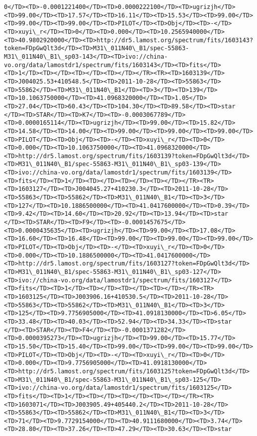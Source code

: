 \documentclass[11pt]{article}
\begin{document}
\begin{Verbatim}[commandchars=\\\{\}]
0</TD><TD>-0.0001221400</TD><TD>0.0000222100</TD><TD>ugrizjh</TD><TD>99.00</TD><TD>17.57</TD><TD>16.11</TD><TD>15.53</TD><TD>99.00</TD><TD>99.00</TD><TD>99.00</TD><TD>PILOT</TD><TD>Obj</TD><TD>-</TD><TD>xuyi\_r</TD><TD>0</TD><TD>0.000</TD><TD>10.2565940000</TD><TD>40.9802920000</TD><TD>http://dr5.lamost.org/spectrum/fits/1603143?token=FDpGwQlt3d</TD><TD>M31\_011N40\_B1/spec-55863-M31\_011N40\_B1\_sp03-143</TD><TD>ivo://china-vo.org/data/lamostdr1/spectrum/fits/1603143</TD><TD>fits</TD><TD>1</TD><TD></TD><TD></TD><TD></TD></TR><TR><TD>1603139</TD><TD>J004025.53+410548.5</TD><TD>2011-10-28</TD><TD>55863</TD><TD>55862</TD><TD>M31\_011N40\_B1</TD><TD>3</TD><TD>139</TD><TD>10.1063750000</TD><TD>41.0968320000</TD><TD>1.05</TD><TD>27.04</TD><TD>60.43</TD><TD>104.30</TD><TD>89.58</TD><TD>star     </TD><TD>STAR</TD><TD>K7</TD><TD>-0.0003067789</TD><TD>0.0000165114</TD><TD>ugrizjh</TD><TD>99.00</TD><TD>15.82</TD><TD>14.58</TD><TD>14.00</TD><TD>99.00</TD><TD>99.00</TD><TD>99.00</TD><TD>PILOT</TD><TD>Obj</TD><TD>-</TD><TD>xuyi\_r</TD><TD>0</TD><TD>0.000</TD><TD>10.1063750000</TD><TD>41.0968320000</TD><TD>http://dr5.lamost.org/spectrum/fits/1603139?token=FDpGwQlt3d</TD><TD>M31\_011N40\_B1/spec-55863-M31\_011N40\_B1\_sp03-139</TD><TD>ivo://china-vo.org/data/lamostdr1/spectrum/fits/1603139</TD><TD>fits</TD><TD>1</TD><TD></TD><TD></TD><TD></TD></TR><TR><TD>1603127</TD><TD>J004045.27+410230.3</TD><TD>2011-10-28</TD><TD>55863</TD><TD>55862</TD><TD>M31\_011N40\_B1</TD><TD>3</TD><TD>127</TD><TD>10.1886500000</TD><TD>41.0417600000</TD><TD>0.39</TD><TD>9.42</TD><TD>14.60</TD><TD>20.92</TD><TD>13.94</TD><TD>star     </TD><TD>STAR</TD><TD>F9</TD><TD>-0.0001457675</TD><TD>0.0000435635</TD><TD>ugrizjh</TD><TD>99.00</TD><TD>17.08</TD><TD>16.60</TD><TD>16.48</TD><TD>99.00</TD><TD>99.00</TD><TD>99.00</TD><TD>PILOT</TD><TD>Obj</TD><TD>-</TD><TD>xuyi\_r</TD><TD>0</TD><TD>0.000</TD><TD>10.1886500000</TD><TD>41.0417600000</TD><TD>http://dr5.lamost.org/spectrum/fits/1603127?token=FDpGwQlt3d</TD><TD>M31\_011N40\_B1/spec-55863-M31\_011N40\_B1\_sp03-127</TD><TD>ivo://china-vo.org/data/lamostdr1/spectrum/fits/1603127</TD><TD>fits</TD><TD>1</TD><TD></TD><TD></TD><TD></TD></TR><TR><TD>1603125</TD><TD>J003906.16+410530.5</TD><TD>2011-10-28</TD><TD>55863</TD><TD>55862</TD><TD>M31\_011N40\_B1</TD><TD>3</TD><TD>125</TD><TD>9.7756905000</TD><TD>41.0918130000</TD><TD>6.05</TD><TD>33.48</TD><TD>40.03</TD><TD>52.94</TD><TD>34.33</TD><TD>star     </TD><TD>STAR</TD><TD>F4</TD><TD>-0.0001371282</TD><TD>0.0000395273</TD><TD>ugrizjh</TD><TD>99.00</TD><TD>15.77</TD><TD>15.50</TD><TD>15.40</TD><TD>99.00</TD><TD>99.00</TD><TD>99.00</TD><TD>PILOT</TD><TD>Obj</TD><TD>-</TD><TD>xuyi\_r</TD><TD>0</TD><TD>0.000</TD><TD>9.7756905000</TD><TD>41.0918130000</TD><TD>http://dr5.lamost.org/spectrum/fits/1603125?token=FDpGwQlt3d</TD><TD>M31\_011N40\_B1/spec-55863-M31\_011N40\_B1\_sp03-125</TD><TD>ivo://china-vo.org/data/lamostdr1/spectrum/fits/1603125</TD><TD>fits</TD><TD>1</TD><TD></TD><TD></TD><TD></TD></TR><TR><TD>1603071</TD><TD>J003905.49+405440.2</TD><TD>2011-10-28</TD><TD>55863</TD><TD>55862</TD><TD>M31\_011N40\_B1</TD><TD>3</TD><TD>71</TD><TD>9.7729154000</TD><TD>40.9111680000</TD><TD>3.74</TD><TD>28.80</TD><TD>37.26</TD><TD>47.29</TD><TD>30.63</TD><TD>star     
\end{Verbatim}
\end{document}
